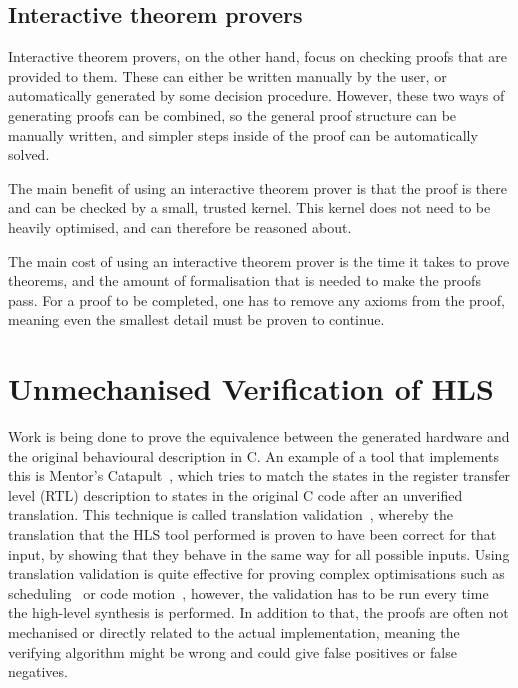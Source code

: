 \subsection{Interactive theorem provers}%
\label{sec:bg:interactive-theorem-provers}

Interactive theorem provers, on the other hand, focus on checking proofs that
are provided to them.  These can either be written manually by the user, or
automatically generated by some decision procedure.  However, these two ways of
generating proofs can be combined, so the general proof structure can be
manually written, and simpler steps inside of the proof can be automatically
solved.

The main benefit of using an interactive theorem prover is that the proof is
there and can be checked by a small, trusted kernel.  This kernel does not need
to be heavily optimised, and can therefore be reasoned about.

The main cost of using an interactive theorem prover is the time it takes to
prove theorems, and the amount of formalisation that is needed to make the
proofs pass.  For a proof to be completed, one has to remove any axioms from the
proof, meaning even the smallest detail must be proven to continue.

\section{Unmechanised Verification of HLS}%
\label{sec:bg:unmechanised-verification-of-hls}

Work is being done to prove the equivalence between the generated hardware and
the original behavioural description in C.  An example of a tool that implements
this is Mentor's Catapult~\cite{mentor20_catap_high_level_synth}, which tries to
match the states in the register transfer level (RTL) description to states in
the original C code after an unverified translation.  This technique is called
translation validation~\cite{pnueli98_trans}, whereby the translation that the
HLS tool performed is proven to have been correct for that input, by showing
that they behave in the same way for all possible inputs.  Using translation
validation is quite effective for proving complex optimisations such as
scheduling~\cite{kim04_autom_fsmd, karfa06_formal_verif_method_sched_high_synth,
  chouksey20_verif_sched_condit_behav_high_level_synth} or code
motion~\cite{banerjee14_verif_code_motion_techn_using_value_propag,
  chouksey19_trans_valid_code_motion_trans_invol_loops}, however, the validation
has to be run every time the high-level synthesis is performed.  In addition to
that, the proofs are often not mechanised or directly related to the actual
implementation, meaning the verifying algorithm might be wrong and could give
false positives or false negatives.

